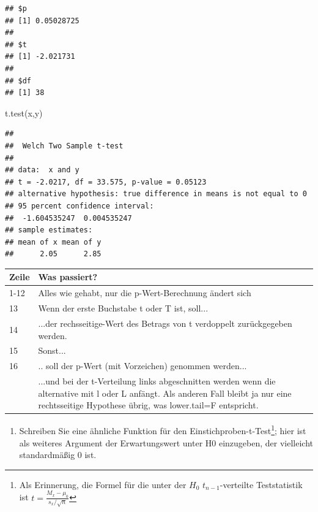 \documentclass[
]{book}
\newenvironment{Shaded}{\begin{snugshade}}{\end{snugshade}}
\newcommand{\FunctionTok}[1]{\textcolor[rgb]{0.00,0.00,0.00}{#1}}
\newcommand{\NormalTok}[1]{#1}
\providecommand{\tightlist}{%
  \setlength{\itemsep}{0pt}\setlength{\parskip}{0pt}}
\begin{document}
\begin{verbatim}
## $p
## [1] 0.05028725
## 
## $t
## [1] -2.021731
## 
## $df
## [1] 38
\end{verbatim}

\begin{Shaded}
\begin{Highlighting}[numbers=left,,]
\FunctionTok{t.test}\NormalTok{(x,y)}
\end{Highlighting}
\end{Shaded}

\begin{verbatim}
## 
##  Welch Two Sample t-test
## 
## data:  x and y
## t = -2.0217, df = 33.575, p-value = 0.05123
## alternative hypothesis: true difference in means is not equal to 0
## 95 percent confidence interval:
##  -1.604535247  0.004535247
## sample estimates:
## mean of x mean of y 
##      2.05      2.85
\end{verbatim}

\begin{table}
\centering
\begin{tabular}[t]{ll}
\toprule
Zeile & Was passiert?\\
\midrule
1-12 & Alles wie gehabt, nur die p-Wert-Berechnung ändert sich\\
13 & Wenn der erste Buchstabe t oder T ist, soll...\\
14 & ...der rechsseitige-Wert des Betrags von t verdoppelt zurückgegeben werden.\\
15 & Sonst...\\
16 & .. soll der p-Wert (mit Vorzeichen) genommen werden...\\
\addlinespace
17 & ...und bei der t-Verteilung links abgeschnitten werden wenn die alternative mit l oder L anfängt. Als anderen Fall bleibt ja nur eine rechtsseitige Hypothese übrig, was lower.tail=F entspricht.\\
\bottomrule
\end{tabular}
\end{table}

\begin{enumerate}
\def\labelenumi{(\arabic{enumi})}
\setcounter{enumi}{4}
\tightlist
\item
  Schreiben Sie eine ähnliche Funktion für den Einstichproben-t-Test\footnote{Als Erinnerung, die Formel für die unter der \(H_0\) \(t_{n-1}\)-verteilte Teststatistik ist \(t = \frac{M_x - \mu_0}{s_x/\sqrt{n}}\)}; hier ist als weiteres Argument der Erwartungswert unter H0 einzugeben, der vielleicht standardmäßig 0 ist.
\end{enumerate}
\end{document}

